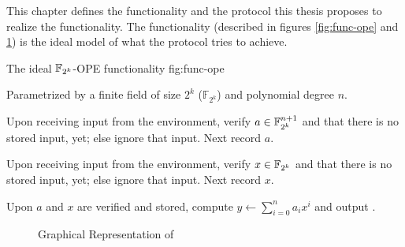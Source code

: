 %
%
\label{sec:protocol}


This chapter defines the functionality \JWfuncSymOPE and the protocol
\JWprotoSymOPE this thesis proposes to realize the functionality. The
functionality (described in figures \ref{fig:func-ope} and \ref{fig:graph-ope})
is the ideal model of what the protocol tries to achieve.

\begin{JWfunc}%
  {\JWfuncSymOPE}%
  {The ideal $\mathbb{F}_{2^k}{}$-OPE functionality \JWfuncSymOPE{}}%
  {fig:func-ope}

  Parametrized by a finite field of size $2^k$ ($\mathbb{F}_{2^k}$)
  and polynomial degree $n$.

  \begin{JWfuncSteps}

  \item Upon receiving input  from the environment, verify
    $a \in \mathbb{F}_{2^k}^{n+1}$ and that there is no stored input, yet; else
    ignore that input. Next record $a$.

  \item Upon receiving input  from the environment,
    verify $x \in \mathbb{F}_{2^k}{}$ and that there is no stored input, yet;
    else ignore that input. Next record $x$.

  \item Upon $a$ and $x$ are verified and stored, compute $y \leftarrow
    \sum_{i=0}^n a_ix^i$ and output .

  \end{JWfuncSteps}
\end{JWfunc}

\begin{figure}[ht]

  \centering


  \caption{Graphical Representation of \JWfuncSymOPE}
  \label{fig:graph-ope}

\end{figure}

